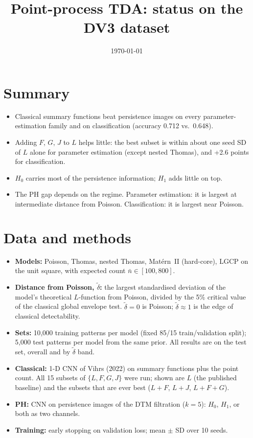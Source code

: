 \documentclass[10pt,a4paper]{article}
\title{\textbf{Point-process TDA: status on the DV3 dataset}}
\date{\today}
\newcommand{\nbar}{\bar n}
\newcommand{\dtil}{\tilde\delta}
\begin{document}
\maketitle

\section{Summary}

\begin{itemize}
  \item Classical summary functions beat persistence images on every parameter-estimation family and on classification (accuracy 0.712 vs.\ 0.648).
  \item Adding $F$, $G$, $J$ to $L$ helps little: the best subset is within about one seed SD of $L$ alone for parameter estimation (except nested Thomas), and +2.6 points for classification.
  \item $H_0$ carries most of the persistence information; $H_1$ adds little on top.
  \item The PH gap depends on the regime. Parameter estimation: it is largest at intermediate distance from Poisson. Classification: it is largest near Poisson.
\end{itemize}

\section{Data and methods}

\begin{itemize}
  \item \textbf{Models:} Poisson, Thomas, nested Thomas, Mat\'ern~II (hard-core), LGCP on the unit square, with expected count $\nbar \in [100, 800]$.
  \item \textbf{Distance from Poisson, $\dtil$:} the largest standardised deviation of the model's theoretical $L$-function from Poisson, divided by the 5\% critical value of the classical global envelope test. $\dtil = 0$ is Poisson; $\dtil \approx 1$ is the edge of classical detectability.
  \item \textbf{Sets:} 10{,}000 training patterns per model (fixed 85/15 train/validation split); 5{,}000 test patterns per model from the same prior. All results are on the test set, overall and by $\dtil$ band.
  \item \textbf{Classical:} 1-D CNN of Vihrs (2022) on summary functions plus the point count. All 15 subsets of $\{L,F,G,J\}$ were run; shown are $L$ (the published baseline) and the subsets that are ever best ($L{+}F$, $L{+}J$, $L{+}F{+}G$).
  \item \textbf{PH:} CNN on persistence images of the DTM filtration ($k=5$): $H_0$, $H_1$, or both as two channels.
  \item \textbf{Training:} early stopping on validation loss; mean $\pm$ SD over 10 seeds.
\end{itemize}
\end{document}
